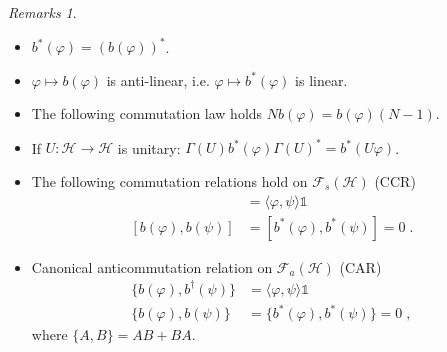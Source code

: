 \documentclass[
a4paper, %
11pt, %
onecolumn, %
openany, %
]{memoir}
\theoremstyle{definition}
\theoremstyle{remark}
\newtheorem{remarks}{Remarks}[chapter]
\theoremstyle{plain}
\begin{document}
\begin{remarks}
	\begin{itemize}
		\item $b^*(\varphi)=(b(\varphi))^*$.
		\item $\varphi\mapsto b(\varphi)$ is anti-linear, i.e. $\varphi\mapsto b^*(\varphi)$ is linear.
		\item The following commutation law holds $Nb(\varphi)=b(\varphi)(N-1)$. 
		\item If $U:\mathcal{H}\rightarrow\mathcal{H}$ is unitary: $\Gamma(U)b^*(\varphi)\Gamma(U)^*=b^*(U\varphi)$.
		\item The following commutation relations hold on $\mathcal{F}_s(\mathcal{H})$ (CCR) \begin{align}
		[b(\varphi),b^*(\psi)]&=\langle\varphi,\psi\rangle\mathds{1}\\
		[b(\varphi),b(\psi)]&=[b^*(\varphi),b^*(\psi)]=0\; .
		\end{align}
		\item Canonical anticommutation relation on $\mathcal{F}_a(\mathcal{H})$ (CAR)\begin{align}
		\{b(\varphi),b^{\dagger}(\psi)\}&=\langle\varphi,\psi\rangle \mathds{1}\\
		\{b(\varphi),b(\psi)\}&=\{b^*(\varphi),b^*(\psi)\}=0\; ,
		\end{align}
		where $\{A,B\}=AB+BA$.
	\end{itemize}
\end{remarks}
\end{document}
